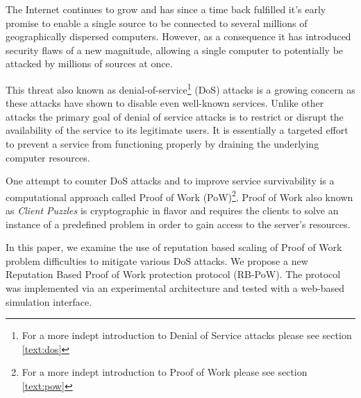The Internet continues to grow and has since a time back fulfilled it's early promise to enable a single source to be connected to several millions of geographically dispersed computers. However, as a consequence it has introduced security flaws of a new magnitude, allowing a single computer to potentially be attacked by millions of sources at once. 

This threat also known as denial-of-service\footnote{For a more indept introduction to Denial of Service attacks please see section \ref{text:dos}} (DoS) attacks is a growing concern as these attacks have shown to disable even well-known services. Unlike other attacks the primary goal of denial of service attacks is to restrict or disrupt the availability of the service to its legitimate users. It is essentially a targeted effort to prevent a service from functioning properly by draining the underlying computer resources. 

One attempt to counter DoS attacks and to improve service survivability is a computational approach called Proof of Work (PoW)\footnote{For a more indept introduction to Proof of Work please see section \ref{text:pow}}. Proof of Work also known as \emph{Client Puzzles}\cite{dosauth, JuelsB99} is cryptographic in flavor and requires the clients to solve an instance of a predefined problem in order to gain access to the server’s resources.


In this paper, we examine the use of reputation based scaling of Proof of Work problem difficulties to mitigate various DoS attacks. We propose a new Reputation Based Proof of Work protection protocol (RB-PoW). The protocol was implemented via an experimental architecture and tested with a web-based simulation interface.


 




